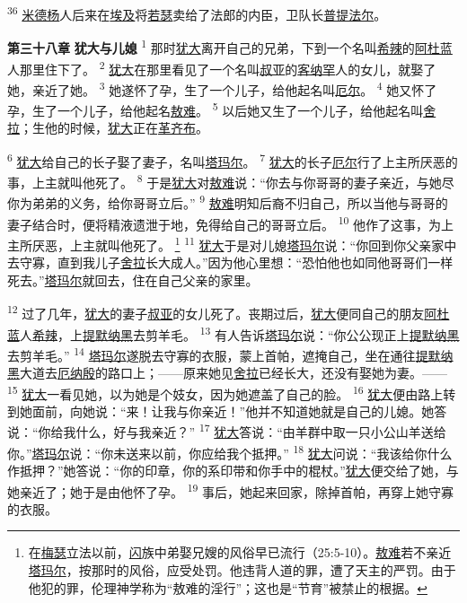 \textsuperscript{36}
\uline{米德杨}人后来在\uline{埃及}将\uline{若瑟}卖给了法郎的内臣，卫队长\uline{普提法尔}。

\textbf{第三十八章 }
\textbf{犹大与儿媳 }
\textsuperscript{1}
那时\uline{犹大}离开自己的兄弟，下到一个名叫\uline{希辣}的\uline{阿杜蓝}人那里住下了。
\textsuperscript{2}
\uline{犹大}在那里看见了一个名叫\uline{叔亚}的\uline{客纳罕}人的女儿，就娶了她，亲近了她。
\textsuperscript{3}
她遂怀了孕，生了一个儿子，给他起名叫\uline{厄尔}。
\textsuperscript{4}
她又怀了孕，生了一个儿子，给他起名\uline{敖难}。
\textsuperscript{5}
以后她又生了一个儿子，给他起名叫\uline{舍拉}；生他的时候，\uline{犹大}正在\uline{革齐布}。

\textsuperscript{6}
\uline{犹大}给自己的长子娶了妻子，名叫\uline{塔玛尔}。
\textsuperscript{7}
\uline{犹大}的长子\uline{厄尔}行了上主所厌恶的事，上主就叫他死了。
\textsuperscript{8}
于是\uline{犹大}对\uline{敖难}说：“你去与你哥哥的妻子亲近，与她尽你为弟弟的义务，给你哥哥立后。”
\textsuperscript{9}
\uline{敖难}明知后裔不归自己，所以当他与哥哥的妻子结合时，便将精液遗泄于地，免得给自己的哥哥立后。
\textsuperscript{10}
他作了这事，为上主所厌恶，上主就叫他死了。
\footnote{在\uline{梅瑟}立法以前，\uline{闪}族中弟娶兄嫂的风俗早已流行（25:5-10）。\uline{敖难}若不亲近\uline{塔玛尔}，按那时的风俗，应受处罚。他违背人道的罪，遭了天主的严罚。由于他犯的罪，伦理神学称为“敖难的淫行”；这也是“节育”被禁止的根据。}
\textsuperscript{11}
\uline{犹大}于是对儿媳\uline{塔玛尔}说：“你回到你父亲家中去守寡，直到我儿子\uline{舍拉}长大成人。”因为他心里想：“恐怕他也如同他哥哥们一样死去。”\uline{塔玛尔}就回去，住在自己父亲的家里。

\textsuperscript{12}
过了几年，\uline{犹大}的妻子\uline{叔亚}的女儿死了。丧期过后，\uline{犹大}便同自己的朋友\uline{阿杜蓝}人\uline{希辣}，上\uline{提默}\uline{纳黑}去剪羊毛。
\textsuperscript{13}
有人告诉\uline{塔玛尔}说：“你公公现正上\uline{提默}\uline{纳黑}去剪羊毛。”
\textsuperscript{14}
\uline{塔玛尔}遂脱去守寡的衣服，蒙上首帕，遮掩自己，坐在通往\uline{提默}\uline{纳黑}大道去\uline{厄纳殷}的路口上；——原来她见\uline{舍拉}已经长大，还没有娶她为妻。——
\textsuperscript{15}
\uline{犹大}一看见她，以为她是个妓女，因为她遮盖了自己的脸。
\textsuperscript{16}
\uline{犹大}便由路上转到她面前，向她说：“来！让我与你亲近！”他并不知道她就是自己的儿媳。她答说：“你给我什么，好与我亲近？”
\textsuperscript{17}
\uline{犹大}答说：“由羊群中取一只小公山羊送给你。”\uline{塔玛尔}说：“你未送来以前，你应给我个抵押。”
\textsuperscript{18}
\uline{犹大}问说：“我该给你什么作抵押？”她答说：“你的印章，你的系印带和你手中的棍杖。”\uline{犹大}便交给了她，与她亲近了；她于是由他怀了孕。
\textsuperscript{19}
事后，她起来回家，除掉首帕，再穿上她守寡的衣服。

